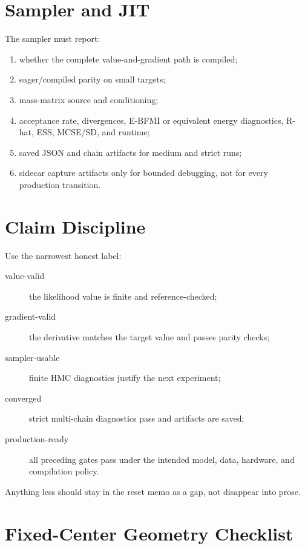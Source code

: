 \section{Sampler and JIT}
\label{sec:bf-production-sampler-jit}

The sampler must report:
\begin{enumerate}[label=(\roman*)]
  \item whether the complete value-and-gradient path is compiled;
  \item eager/compiled parity on small targets;
  \item mass-matrix source and conditioning;
  \item acceptance rate, divergences, E-BFMI or equivalent energy diagnostics,
    R-hat, ESS, MCSE/SD, and runtime;
  \item saved JSON and chain artifacts for medium and strict runs;
  \item sidecar capture artifacts only for bounded debugging, not for every
    production transition.
\end{enumerate}

\section{Claim Discipline}
\label{sec:bf-production-claim-discipline}

Use the narrowest honest label:
\begin{description}
  \item[value-valid] the likelihood value is finite and reference-checked;
  \item[gradient-valid] the derivative matches the target value and passes
    parity checks;
  \item[sampler-usable] finite HMC diagnostics justify the next experiment;
  \item[converged] strict multi-chain diagnostics pass and artifacts are saved;
  \item[production-ready] all preceding gates pass under the intended model,
    data, hardware, and compilation policy.
\end{description}
Anything less should stay in the reset memo as a gap, not disappear into prose.

\section{Fixed-Center Geometry Checklist}
\label{sec:bf-production-fixed-center-geometry}


